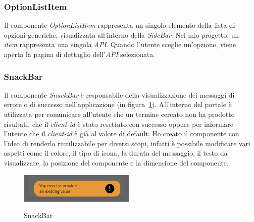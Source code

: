 \subsubsection{OptionListItem}\label{subsubsec:option-list-item}
Il componente \textit{OptionListItem} rappresenta un singolo elemento della lista di opzioni generiche, visualizzata all'interno della \textit{SideBar}. Nel mio progetto, un \textit{item} rappresenta una singola \textit{API}.
Quando l'utente sceglie un'opzione, viene aperta la pagina di dettaglio dell'\textit{API} selezionata.

\subsubsection{SnackBar}\label{subsubsec:snack-bar}
Il componente \textit{SnackBar} è responsabile della visualizzazione dei messaggi di errore o di successo nell'applicazione (in figura~\ref{fig:snack-bar}).
All'interno del portale è utilizzata per comunicare all'utente che un termine cercato non ha prodotto risultati, che il \textit{client-id} è stato resettato con successo
oppure per informare l'utente che il \textit{client-id} è già al valore di default.
Ho creato il componente con l'idea di renderlo riutilizzabile per diversi scopi, infatti è possibile modificare vari aspetti come il colore, il tipo di icona,
la durata del messaggio, il testo da visualizzare, la posizione del componente e la dimensione del componente.

\begin{figure}[ht]
  \centering
  \includegraphics[width=0.5\textwidth, alt={Snackbar di errore}]{images/frontend/SnackBar1.jpg}
  \caption{SnackBar}\label{fig:snack-bar}
\end{figure}

